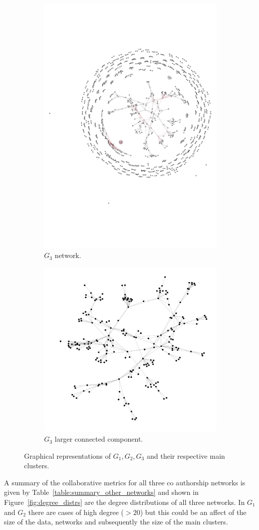 \documentclass{article}
\theoremstyle{definition}
\begin{document}
\begin{figure}[!hbtp]
    \begin{subfigure}{.45\textwidth}\centering
        \includegraphics[width=.54\textwidth]{./assets/images/anarchy_network.pdf}
        \caption{\(G_3\) network.}\label{fig:g_three}
     \end{subfigure}
     \begin{subfigure}{.45\textwidth}\centering
        \includegraphics[width=.54\textwidth]{./assets/images/anarchy_network_cluster.pdf}
        \caption{\(G_3\) larger connected component.}\label{fig:g_three_cluster}
     \end{subfigure}
     \caption{Graphical representations of \(G_1, G_2, G_3\) and their respective
     main clusters.}
\end{figure}

A summary of the collaborative metrics for all three co authorship networks is given by
Table~\ref{table:summary_other_networks} and shown in Figure~\ref{fig:degree_distrs}
are the degree distributions of all three networks. In \(G_1\) and \(G_2\) there
are cases of high degree (\(> 20\)) but this could be an affect of the size of
the data, networks and subsequently the size of the main clusters.
\end{document}
